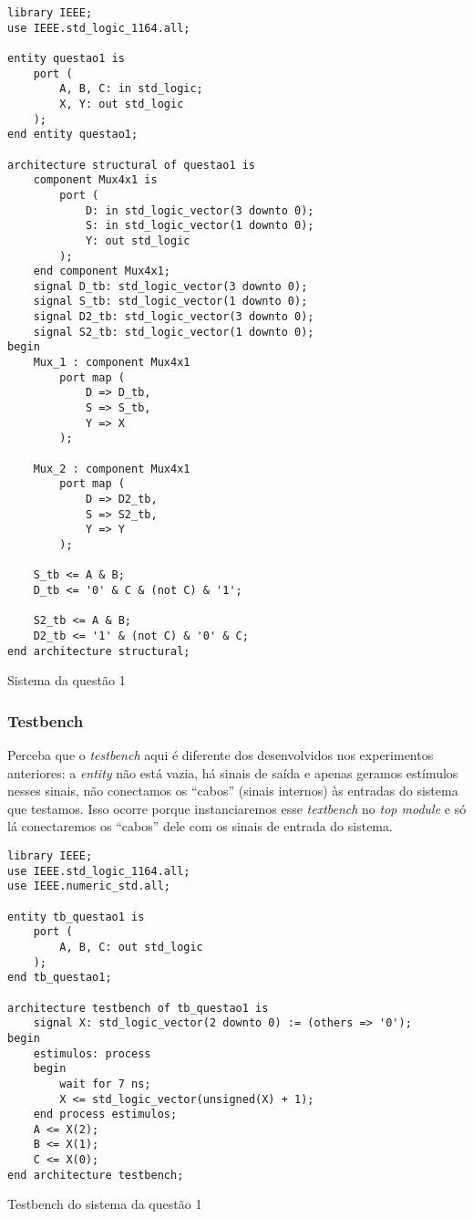 \documentclass[a4paper,12pt]{article}
\newenvironment{code}{\captionsetup{type=listing}}{}
\begin{document}
\begin{code}
    \begin{verbatim}
library IEEE;
use IEEE.std_logic_1164.all;

entity questao1 is
    port (
        A, B, C: in std_logic;
        X, Y: out std_logic
    );
end entity questao1;

architecture structural of questao1 is
    component Mux4x1 is
        port (
            D: in std_logic_vector(3 downto 0);
            S: in std_logic_vector(1 downto 0);
            Y: out std_logic
        );
    end component Mux4x1;
    signal D_tb: std_logic_vector(3 downto 0);
    signal S_tb: std_logic_vector(1 downto 0);
    signal D2_tb: std_logic_vector(3 downto 0);
    signal S2_tb: std_logic_vector(1 downto 0);
begin
    Mux_1 : component Mux4x1
        port map (
            D => D_tb,
            S => S_tb,
            Y => X
        );
    
    Mux_2 : component Mux4x1
        port map (
            D => D2_tb,
            S => S2_tb,
            Y => Y
        );
    
    S_tb <= A & B;
    D_tb <= '0' & C & (not C) & '1';
    
    S2_tb <= A & B;
    D2_tb <= '1' & (not C) & '0' & C;
end architecture structural;
    \end{verbatim}
    \caption{Sistema da questão 1}
\end{code}

\subsubsection{Testbench}
 Perceba que o \textit{testbench} aqui é diferente dos desenvolvidos nos experimentos anteriores: a \textit{entity} não está vazia, há sinais de saída e apenas geramos estímulos nesses sinais, não conectamos os ``cabos'' (sinais internos) às entradas do sistema que testamos. Isso ocorre porque instanciaremos esse \textit{textbench} no \textit{top module} e só lá conectaremos os ``cabos'' dele com os sinais de entrada do sistema.
\begin{code}
    \begin{verbatim}
library IEEE;
use IEEE.std_logic_1164.all;
use IEEE.numeric_std.all;

entity tb_questao1 is
    port (
        A, B, C: out std_logic
    );
end tb_questao1;

architecture testbench of tb_questao1 is
    signal X: std_logic_vector(2 downto 0) := (others => '0');
begin
    estimulos: process
    begin
        wait for 7 ns;
        X <= std_logic_vector(unsigned(X) + 1);
    end process estimulos;
    A <= X(2);
    B <= X(1);
    C <= X(0);
end architecture testbench;
    \end{verbatim}
    \caption{Testbench do sistema da questão 1}
\end{code}
\end{document}
